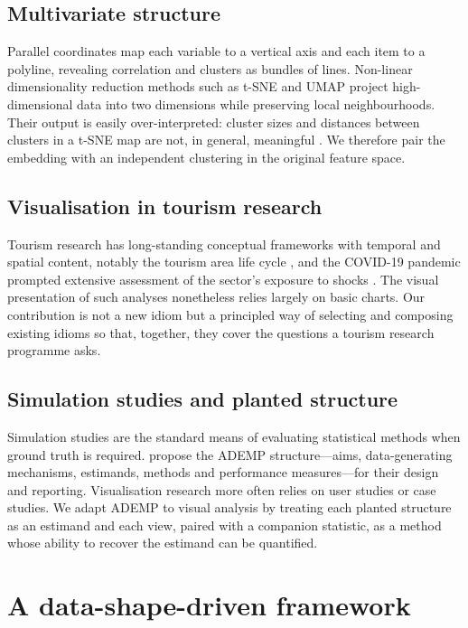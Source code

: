 \documentclass{article}
\begin{document}
\subsection{Multivariate structure}
Parallel coordinates \citep{inselberg1985} map each variable to a vertical axis and each item to a polyline,
revealing correlation and clusters as bundles of lines. Non-linear dimensionality reduction methods such as
t-SNE \citep{vandermaaten2008} and UMAP \citep{mcinnes2018} project high-dimensional data into two dimensions
while preserving local neighbourhoods. Their output is easily over-interpreted: cluster sizes and distances
between clusters in a t-SNE map are not, in general, meaningful \citep{wattenberg2016}. We therefore pair the
embedding with an independent clustering in the original feature space.

\subsection{Visualisation in tourism research}
Tourism research has long-standing conceptual frameworks with temporal and spatial content, notably the
tourism area life cycle \citep{butler1980}, and the COVID-19 pandemic prompted extensive assessment of the
sector's exposure to shocks \citep{gossling2021}. The visual presentation of such analyses nonetheless relies
largely on basic charts. Our contribution is not a new idiom but a principled way of selecting and composing
existing idioms so that, together, they cover the questions a tourism research programme asks.

\subsection{Simulation studies and planted structure}
Simulation studies are the standard means of evaluating statistical methods when ground truth is required.
\citet{morris2019} propose the ADEMP structure---aims, data-generating mechanisms, estimands, methods and
performance measures---for their design and reporting. Visualisation research more often relies on user
studies or case studies. We adapt ADEMP to visual analysis by treating each planted structure as an estimand
and each view, paired with a companion statistic, as a method whose ability to recover the estimand can be
quantified.

\section{A data-shape-driven framework}\label{sec:framework}
\end{document}
